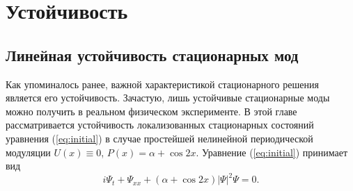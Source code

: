 \chapter{Устойчивость}

\section{Линейная устойчивость стационарных мод}	

Как упоминалось ранее, важной характеристикой стационарного решения является его устойчивость.
Зачастую, лишь устойчивые стационарные моды можно получить в реальном физическом эксперименте.
В этой главе рассматривается устойчивость локализованных стационарных состояний уравнения (\ref{eq:initial}) в случае простейшей нелинейной периодической модуляции $U(x) \equiv 0$, $P(x) = \alpha + \cos 2x$.
Уравнение (\ref{eq:initial}) принимает вид
%
\begin{equation}
i\Psi_t + \Psi_{xx} + (\alpha + \cos 2x) |\Psi|^2 \Psi = 0.
\label{eq:stability}
\end{equation}
%

